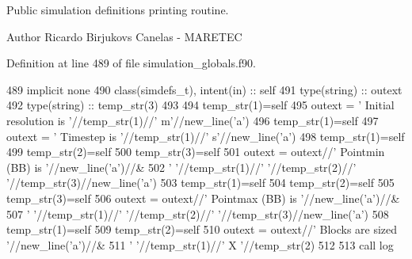 Public simulation definitions printing routine. 

\begin{DoxyAuthor}{Author}
Ricardo Birjukovs Canelas -\/ M\+A\+R\+E\+T\+EC 
\end{DoxyAuthor}


Definition at line 489 of file simulation\+\_\+globals.\+f90.


\begin{DoxyCode}
489     \textcolor{keywordtype}{implicit none}
490     \textcolor{keywordtype}{class}(simdefs\_t), \textcolor{keywordtype}{intent(in)} :: self
491     \textcolor{keywordtype}{type}(string) :: outext
492     \textcolor{keywordtype}{type}(string) :: temp\_str(3)
493 
494     temp\_str(1)=self%
495     outext = \textcolor{stringliteral}{'      Initial resolution is '}//temp\_str(1)//\textcolor{stringliteral}{' m'}//new\_line(\textcolor{stringliteral}{'a'})
496     temp\_str(1)=self%
497     outext = \textcolor{stringliteral}{'      Timestep is '}//temp\_str(1)//\textcolor{stringliteral}{' s'}//new\_line(\textcolor{stringliteral}{'a'})
498     temp\_str(1)=self%
499     temp\_str(2)=self%
500     temp\_str(3)=self%
501     outext = outext//\textcolor{stringliteral}{'       Pointmin (BB) is '}//new\_line(\textcolor{stringliteral}{'a'})//&
502         \textcolor{stringliteral}{'       '}//temp\_str(1)//\textcolor{stringliteral}{' '}//temp\_str(2)//\textcolor{stringliteral}{' '}//temp\_str(3)//new\_line(\textcolor{stringliteral}{'a'})
503     temp\_str(1)=self%
504     temp\_str(2)=self%
505     temp\_str(3)=self%
506     outext = outext//\textcolor{stringliteral}{'       Pointmax (BB) is '}//new\_line(\textcolor{stringliteral}{'a'})//&
507         \textcolor{stringliteral}{'       '}//temp\_str(1)//\textcolor{stringliteral}{' '}//temp\_str(2)//\textcolor{stringliteral}{' '}//temp\_str(3)//new\_line(\textcolor{stringliteral}{'a'})
508     temp\_str(1)=self%
509     temp\_str(2)=self%
510     outext = outext//\textcolor{stringliteral}{'       Blocks are sized '}//new\_line(\textcolor{stringliteral}{'a'})//&
511         \textcolor{stringliteral}{'       '}//temp\_str(1)//\textcolor{stringliteral}{' X '}//temp\_str(2)
512 
513     \textcolor{keyword}{call }log%
\end{DoxyCode}
\mbox{\label{namespacesimulation__globals__mod_a97c04d0289a9f2d004a9329cb7ab16f0}} 
